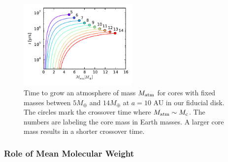 \documentclass[apj]{emulateapj}
\begin{document}
\begin{figure}[h]
\centering
\includegraphics[width=0.52\textwidth]{../../figs/ModelAtmospheres/RadSelfGravPoly/PaperFigs/cumul_coolingtime_vs_Matm_10au_mu235.pdf}
\caption{Time to grow an atmosphere of mass $M_{\rm{atm}}$ for cores with fixed masses between $5 M_{\oplus}$ and $14 M_{\oplus}$ at $a=10$ AU in our fiducial disk. The circles mark the crossover time where $M_{\rm{atm}} \sim M_{\rm c}$. The numbers are labeling the core mass in Earth masses. A larger core mass results in a shorter crossover time.}
\label{fig:tvsM}
\end{figure}



\subsubsection{Role of Mean Molecular Weight}
\label{muopacity}

\end{document}
